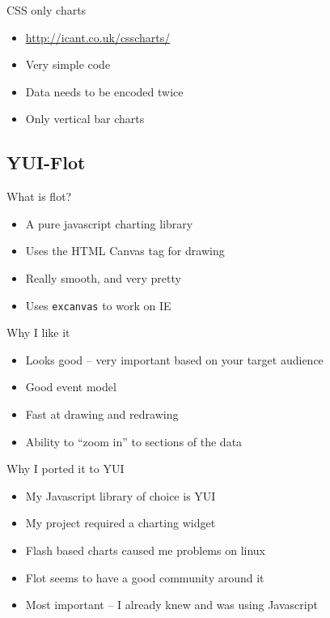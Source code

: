 \documentclass{beamer}
\begin{document}
\begin{frame}{CSS only charts}
  \begin{itemize}
  \item \href{http://icant.co.uk/csscharts/}{http://icant.co.uk/csscharts/}
  \item Very simple code
  \item Data needs to be encoded twice
  \item Only vertical bar charts
  \end{itemize}
\end{frame}

\subsection{YUI-Flot}

\begin{frame}{What is flot?}
  \begin{itemize}
  \item A pure javascript charting library
  \item Uses the HTML Canvas tag for drawing
  \item Really smooth, and very pretty
  \item Uses \texttt{excanvas} to work on IE
  \end{itemize}
\end{frame}

\begin{frame}{Why I like it}
  \begin{itemize}
  \item Looks good -- very important based on your target audience
  \item Good event model
  \item Fast at drawing and redrawing
  \item Ability to ``zoom in'' to sections of the data
  \end{itemize}
\end{frame}

\begin{frame}{Why I ported it to YUI}
  \begin{itemize}
  \item My Javascript library of choice is YUI
  \item My project required a charting widget
  \item Flash based charts caused me problems on linux
  \item Flot seems to have a good community around it
  \item Most important -- I already knew and was using Javascript
  \end{itemize}
\end{frame}
\end{document}

